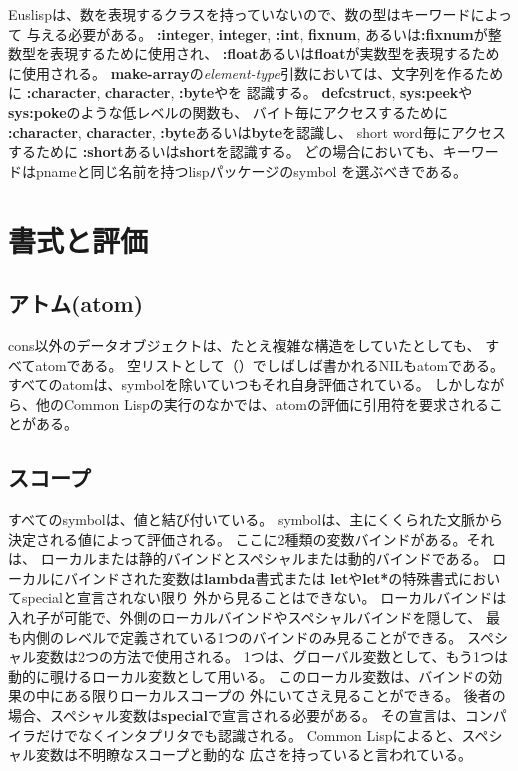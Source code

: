 Euslispは、数を表現するクラスを持っていないので、数の型はキーワードによって
与える必要がある。
{\bf :integer}, {\bf integer}, {\bf :int}, {\bf fixnum},
あるいは{\bf :fixnum}が整数型を表現するために使用され、
{\bf :float}あるいは{\bf float}が実数型を表現するために使用される。
{\bf make-array}の{\em element-type}引数においては、文字列を作るために
{\bf :character}, {\bf character}, {\bf :byte}やを
認識する。
{\bf defcstruct}, {\bf sys:peek}や{\bf sys:poke}のような低レベルの関数も、
バイト毎にアクセスするために
{\bf :character}, {\bf character}, {\bf :byte}あるいは{\bf byte}を認識し、
short word毎にアクセスするために
{\bf :short}あるいは{\bf short}を認識する。
どの場合においても、キーワードはpnameと同じ名前を持つlispパッケージのsymbol
を選ぶべきである。

\newpage

\section{書式と評価}
\subsection{アトム(atom)}

cons以外のデータオブジェクトは、たとえ複雑な構造をしていたとしても、
すべてatomである。
空リストとして（）でしばしば書かれるNILもatomである。
すべてのatomは、symbolを除いていつもそれ自身評価されている。
しかしながら、他のCommon Lispの実行のなかでは、atomの評価に引用符を要求されることがある。

\subsection{スコープ}

すべてのsymbolは、値と結び付いている。
symbolは、主にくくられた文脈から決定される値によって評価される。
ここに2種類の変数バインドがある。それは、
ローカルまたは静的バインドとスペシャルまたは動的バインドである。
ローカルにバインドされた変数は{\bf lambda}書式または
{\bf let}や{\bf let*}の特殊書式においてspecialと宣言されない限り
外から見ることはできない。
ローカルバインドは入れ子が可能で、外側のローカルバインドやスペシャルバインドを隠して、
最も内側のレベルで定義されている1つのバインドのみ見ることができる。
スペシャル変数は2つの方法で使用される。
1つは、グローバル変数として、もう1つは動的に覗けるローカル変数として用いる。
このローカル変数は、バインドの効果の中にある限りローカルスコープの
外にいてさえ見ることができる。
後者の場合、スペシャル変数は{\bf special}で宣言される必要がある。
その宣言は、コンパイラだけでなくインタプリタでも認識される。
Common Lispによると、スペシャル変数は不明瞭なスコープと動的な
広さを持っていると言われている。

